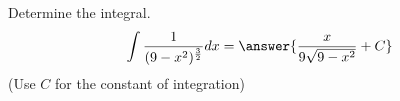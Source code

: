 \documentclass{ximera}
\author{Jason Miller}
\begin{document}
\begin{exercise}
Determine the integral. 
\[
\int \frac{1}{(9-x^{2})^{\frac{3}{2}}}  dx=\answer{  \frac{x}{9\sqrt{9-x^{2}}}+C}
\]
(Use $C$ for the constant of integration)

\end{exercise}
\end{document}
